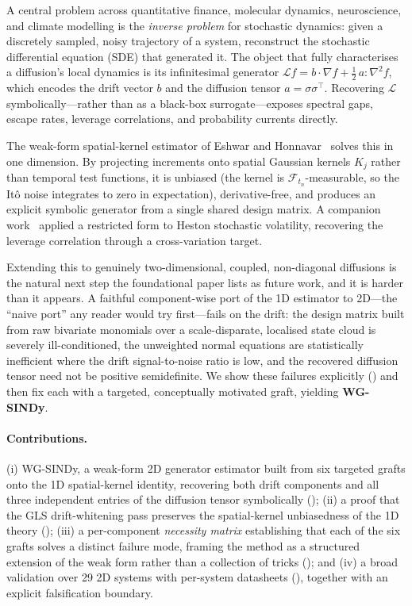 \documentclass[11pt]{article}
\newcommand{\drift}{b}
\newcommand{\diff}{a}
\newcommand{\Lgen}{\mathcal{L}}
\newcommand{\Kj}{K_j}
\begin{document}
A central problem across quantitative finance, molecular dynamics, neuroscience, and climate
modelling is the \emph{inverse problem} for stochastic dynamics: given a discretely sampled,
noisy trajectory of a system, reconstruct the stochastic differential equation (SDE) that
generated it. The object that fully characterises a diffusion's local dynamics is its
infinitesimal generator $\Lgen f = \drift\!\cdot\!\nabla f + \tfrac{1}{2}\,\diff\!:\!\nabla^2 f$,
which encodes the drift vector $\drift$ and the diffusion tensor $\diff=\sigma\sigma^\top$.
Recovering $\Lgen$ symbolically---rather than as a black-box surrogate---exposes spectral gaps,
escape rates, leverage correlations, and probability currents directly.

The weak-form spatial-kernel estimator of Eshwar and Honnavar~\citep{eshwar2026weak} solves
this in one dimension. By projecting increments onto spatial Gaussian kernels $\Kj$ rather than
temporal test functions, it is unbiased (the kernel is $\mathcal{F}_{t_n}$-measurable, so the
It\^o noise integrates to zero in expectation), derivative-free, and produces an explicit
symbolic generator from a single shared design matrix. A companion
work~\citep{gullipalli2026heston} applied a restricted form to Heston stochastic volatility,
recovering the leverage correlation through a cross-variation target.

Extending this to genuinely two-dimensional, coupled, non-diagonal diffusions is the natural
next step the foundational paper lists as future work, and it is harder than it appears. A
faithful component-wise port of the 1D estimator to 2D---the ``naive port'' any reader would
try first---fails on the drift: the design matrix built from raw bivariate monomials over a
scale-disparate, localised state cloud is severely ill-conditioned, the unweighted normal
equations are statistically inefficient where the drift signal-to-noise ratio is low, and the
recovered diffusion tensor need not be positive semidefinite. We show these failures explicitly
() and then fix each with a targeted, conceptually motivated graft, yielding
\textbf{WG-SINDy}.

\paragraph{Contributions.}
(i) WG-SINDy, a weak-form 2D generator estimator built from six targeted grafts onto the 1D
spatial-kernel identity, recovering both drift components and all three independent entries of
the diffusion tensor symbolically (); (ii) a proof that the GLS drift-whitening
pass preserves the spatial-kernel unbiasedness of the 1D theory ();
(iii) a per-component \emph{necessity matrix} establishing that each of the six grafts solves a
distinct failure mode, framing the method as a structured extension of the weak form rather than
a collection of tricks (); and (iv) a broad validation over 29 2D systems
with per-system datasheets (), together with an explicit falsification
boundary.
\end{document}
